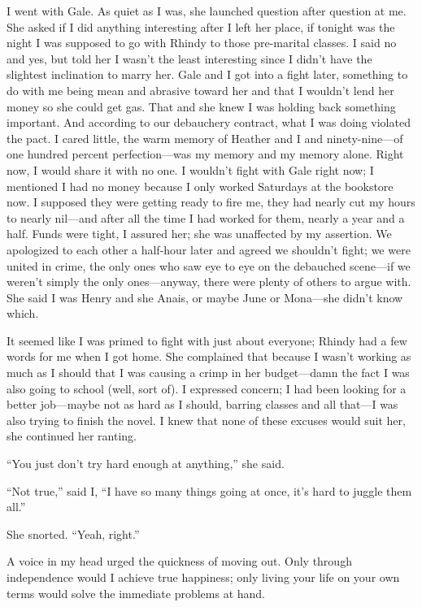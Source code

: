 I went with Gale. As quiet as I was, she launched question after
question at me. She asked if I did anything interesting after I left her
place, if tonight was the night I was supposed to go with Rhindy to
those pre-marital classes. I said no and yes, but told her I wasn't the
least interesting since I didn't have the slightest inclination to marry
her. Gale and I got into a fight later, something to do with me being
mean and abrasive toward her and that I wouldn't lend her money so she
could get gas. That and she knew I was holding back something important.
And according to our debauchery contract, what I was doing violated the
pact. I cared little, the warm memory of Heather and I and
ninety-nine---of one hundred percent perfection---was my memory and my
memory alone. Right now, I would share it with no one. I wouldn't fight
with Gale right now; I mentioned I had no money because I only worked
Saturdays at the bookstore now. I supposed they were getting ready to
fire me, they had nearly cut my hours to nearly nil---and after all the
time I had worked for them, nearly a year and a half. Funds were tight,
I assured her; she was unaffected by my assertion. We apologized to each
other a half-hour later and agreed we shouldn't fight; we were united in
crime, the only ones who saw eye to eye on the debauched scene---if we
weren't simply the only ones---anyway, there were plenty of others to
argue with. She said I was Henry and she Anais, or maybe June or
Mona---she didn't know which.

It seemed like I was primed to fight with just about everyone; Rhindy
had a few words for me when I got home. She complained that because I
wasn't working as much as I should that I was causing a crimp in her
budget---damn the fact I was also going to school (well, sort of). I
expressed concern; I had been looking for a better job---maybe not as
hard as I should, barring classes and all that---I was also trying to
finish the novel. I knew that none of these excuses would suit her, she
continued her ranting.

``You just don't try hard enough at anything,'' she said.

``Not true,'' said I, ``I have so many things going at once, it's hard
to juggle them all.''

She snorted. ``Yeah, right.''

A voice in my head urged the quickness of moving out. Only through
independence would I achieve true happiness; only living your life on
your own terms would solve the immediate problems at hand.

